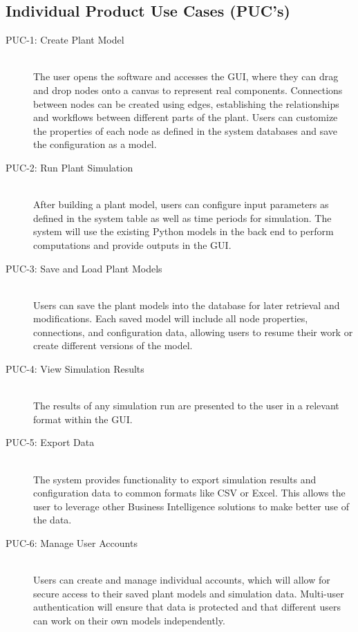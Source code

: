 \documentclass[12pt]{article}
\begin{document}
\clearpage

\subsection{Individual Product Use Cases (PUC's)}
\begin{description}
    \item[PUC-1: Create Plant Model] \hfill \\
    The user opens the software and accesses the GUI, where they can drag and drop nodes onto a canvas to represent real components. Connections between nodes can be created using edges, establishing the relationships and workflows between different parts of the plant. Users can customize the properties of each node as defined in the system databases and save the configuration as a model.
    
    \item[PUC-2: Run Plant Simulation] \hfill \\
    After building a plant model, users can configure input parameters as defined in the system table as well as time periods for simulation. The system will use the existing Python models in the back end to perform computations and provide outputs in the GUI.

    \item[PUC-3: Save and Load Plant Models] \hfill \\
    Users can save the plant models into the database for later retrieval and modifications. Each saved model will include all node properties, connections, and configuration data, allowing users to resume their work or create different versions of the model.

    \item[PUC-4: View Simulation Results] \hfill \\
    The results of any simulation run are presented to the user in a relevant format within the GUI. 
    \item[PUC-5: Export Data] \hfill \\
    The system provides functionality to export simulation results and configuration data to common formats like CSV or Excel. This allows the user to leverage other Business Intelligence solutions to make better use of the data. 
 
    \item[PUC-6: Manage User Accounts] \hfill \\
    Users can create and manage individual accounts, which will allow for secure access to their saved plant models and simulation data. Multi-user authentication will ensure that data is protected and that different users can work on their own models independently.
\end{description}
\end{document}
